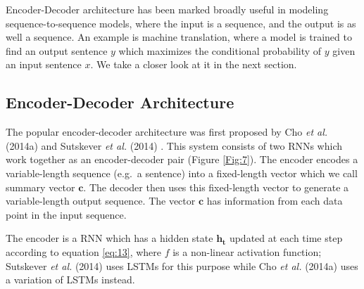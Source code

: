 Encoder-Decoder architecture has been marked broadly useful in modeling sequence-to-sequence models, where the input is a sequence, and the output is as well a sequence. An example is machine translation, where a model is trained to find an output sentence $y$ which maximizes the conditional probability of $y$ given an input sentence $x$. We take a closer look at it in the next section.


 

\subsection{Encoder-Decoder Architecture} 
\label{bg:sub9}

The popular encoder-decoder architecture was first proposed by Cho \textit{et al.} (2014a) \cite{cho2014learning} and Sutskever \textit{et al.} (2014) \cite{sutskever2014sequence}. This system consists of two \ac{RNN}s which work together as an encoder-decoder pair (Figure \ref{Fig:7}). The encoder encodes a variable-length sequence (e.g.\ a sentence) into a fixed-length vector which we call summary vector $ \mathbf{c} $. The decoder then uses this fixed-length vector to generate a variable-length output sequence. The vector $ \mathbf{c} $ has information from each data point in the input sequence.


The encoder is a \ac{RNN} which has a hidden state $\mathbf{h_t}$ updated at each time step according to equation \ref{eq:13}, where $f$ is a non-linear activation function;  Sutskever \textit{et al.} (2014) \cite{sutskever2014sequence} uses \ac{LSTM}s for this purpose while Cho \textit{et al.} (2014a) \cite{cho2014learning} uses a variation of \ac{LSTM}s instead.

